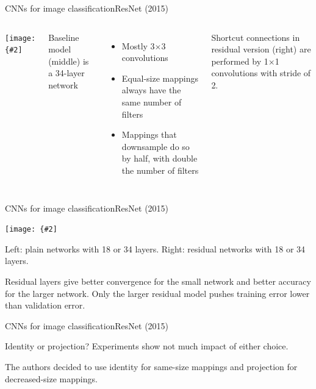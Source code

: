 \documentclass[aspectratio=169]{beamer}
\newcommand{\myfig}[3]{\centerline{\texttt{[image: \{\#2]}}}
\begin{document}
\begin{frame}{CNNs for image classification}{ResNet (2015)}

  \begin{columns}

    \column{1.4in}
    
    \myfig{1.1in}{he-fig3}{He et al.\ (2016), Fig.\ 3}

    \column{3.1in}

    Baseline model (middle) is a 34-layer network
    \begin{itemize}
    \item Mostly 3$\times$3 convolutions
    \item Equal-size mappings always have the same number of filters
    \item Mappings that downsample do so by half, with double the
      number of filters
    \end{itemize}

    \medskip

    Shortcut connections in residual version (right) are performed
    by 1$\times$1 convolutions with stride of 2.
    
  \end{columns}

\end{frame}


\begin{frame}{CNNs for image classification}{ResNet (2015)}

  \myfig{4in}{he-fig4}{He et al.\ (2016), Fig.\ 4}

  \medskip

  Left: plain networks with 18 or 34 layers. Right: residual networks
  with 18 or 34 layers.

  \medskip

  Residual layers give better convergence for the small network and
  better accuracy for the larger network. Only the larger residual
  model pushes training error lower than validation error.
  
\end{frame}


\begin{frame}{CNNs for image classification}{ResNet (2015)}

  Identity or projection? Experiments show not much impact of either
  choice.

  \medskip

  The authors decided to use identity for same-size mappings
  and projection for decreased-size mappings.

\end{frame}
\end{document}
